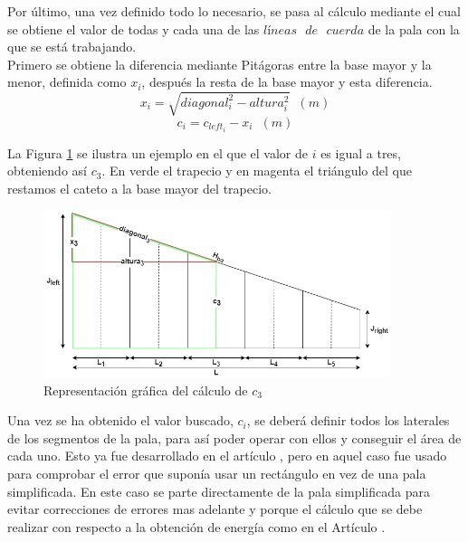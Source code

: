 Por último, una vez definido todo lo necesario, se pasa al cálculo mediante el cual se obtiene el valor de todas y cada una de las $líneas \text{ } de \text{ } cuerda$ de la pala con la que se está trabajando.\\

Primero se obtiene la diferencia mediante Pitágoras entre la base mayor y la menor, definida como $x_i$, después la resta de la base mayor y esta diferencia.
\begin{equation}
 x_i = \sqrt{diagonal_i^{2} - altura_i^{2}} \hspace{7pt} (m)
 \end{equation}
 \begin{equation}
 c_i = c_{left_i} - x_i \hspace{7pt} (m)
\label{def:chord_line}
\end{equation}

La Figura \ref{fig:sacar_c3} se ilustra un ejemplo en el que  el valor de $i$ es igual a tres, obteniendo así $c_3$. En verde el trapecio y en magenta el triángulo del que restamos el cateto a la base mayor del trapecio.\\

\begin{figure}[H]
    \centering
    \includegraphics[width=0.9\textwidth]{images/Trapecio calculo x.png}
    \caption{Representación gráfica del cálculo de $c_3$} 
    \label{fig:sacar_c3}
\end{figure}


Una vez se ha obtenido el valor buscado, $c_i$, se deberá definir todos los laterales de los segmentos de la pala, para así poder operar con ellos y conseguir el área de cada uno. Esto ya fue desarrollado en el artículo \cite{armenta2021predictive}, pero en aquel caso fue usado para comprobar el error que suponía usar un rectángulo en vez de una pala simplificada. En este caso se parte directamente de la pala simplificada para evitar correcciones de errores mas adelante y porque el cálculo que se debe realizar con respecto a la obtención de energía como en el Artículo \cite{armenta2021predictive}.\\

